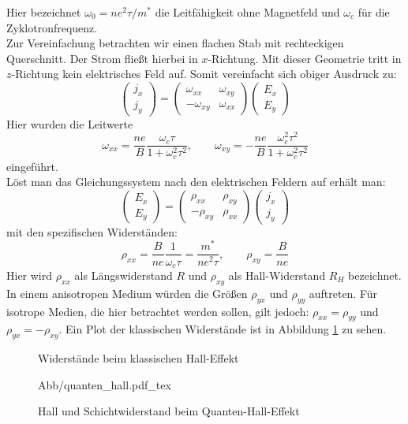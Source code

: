 Hier bezeichnet $\omega_0 = n e^2 \tau / m^*$ die Leitfähigkeit ohne Magnetfeld
und $\omega_c$ für die Zyklotronfrequenz.\\
Zur Vereinfachung betrachten wir einen flachen Stab mit rechteckigen Querschnitt.
Der Strom fließt hierbei in $x$-Richtung. Mit dieser Geometrie tritt in
$z$-Richtung kein elektrisches Feld auf. Somit vereinfacht sich obiger Ausdruck zu:
\[
    \begin{pmatrix}
        j_x \\ j_y
    \end{pmatrix}
    = \begin{pmatrix}
         \omega_{xx} & \omega_{xy} \\
        -\omega_{xy} & \omega_{xx}
      \end{pmatrix}
      \begin{pmatrix}
          E_x \\ E_y
      \end{pmatrix}
\]
Hier wurden die Leitwerte
\[
    \omega_{xx} = \frac{ne}{B} \frac{\omega_c \tau}{1+\omega_c^2 \tau^2}, \qquad
    \omega_{xy} = -\frac{ne}{B} \frac{\omega_c^2 \tau^2}{1+\omega_c^2 \tau^2}
\]
eingeführt.\\
Löst man das Gleichungssystem nach den elektrischen Feldern auf erhält man:
\[
    \begin{pmatrix} E_x \\ E_y \end{pmatrix}
    = \begin{pmatrix}
         \rho_{xx} & \rho_{xy} \\
        -\rho_{xy} & \rho_{xx} 
      \end{pmatrix}
      \begin{pmatrix}
          j_x \\ j_y
      \end{pmatrix}
\]
mit den spezifischen Widerständen:
\[
    \rho_{xx} = \frac{B}{ne} \frac{1}{\omega_c \tau} = \frac{m^*}{ne^2\tau}, \qquad
    \rho_{xy} = \frac{B}{ne}
\]
Hier wird $\rho_{xx}$ als Längswiderstand $R$ und $\rho_{xy}$ als Hall-Widerstand
$R_H$ bezeichnet.
In einem anisotropen Medium würden die Größen $\rho_{yx}$ und $\rho_{yy}$
auftreten. Für isotrope Medien, die hier betrachtet werden sollen, gilt jedoch:
$\rho_{xx} = \rho_{yy}$ und $\rho_{yx} = - \rho_{xy}$. Ein Plot der klassischen
Widerstände ist in Abbildung \ref{Abb:klassisch} zu sehen.
\begin{figure}
    \centering
    
    \caption{Widerstände beim klassischen Hall-Effekt}
    \label{Abb:klassisch}
\end{figure}

\begin{figure}
    \centering
    \def\svgwidth{0.6\linewidth}
    {Abb/quanten_hall.pdf_tex}
    \caption{Hall und Schichtwiderstand beim Quanten-Hall-Effekt}
    \label{vorb:qh}
\end{figure}
